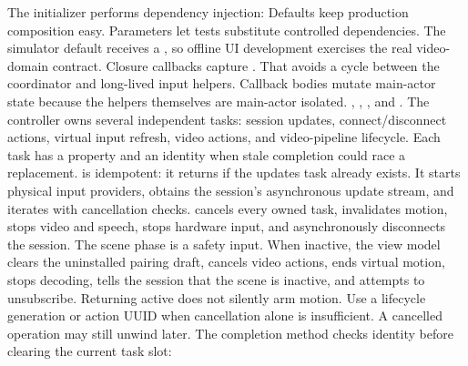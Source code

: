 {}The initializer performs dependency injection:\markdownRendererInterblockSeparator
{}\markdownRendererInterblockSeparator
{}Defaults keep production composition easy. Parameters let tests substitute controlled dependencies. The simulator default receives a , so offline UI development exercises the real video-domain contract.\markdownRendererParagraphSeparator
{}Closure callbacks capture . That avoids a cycle between the coordinator and long-lived input helpers. Callback bodies mutate main-actor state because the helpers themselves are main-actor isolated.\markdownRendererInterblockSeparator
{}
\markdownRendererSectionEnd \markdownRendererSectionBegin
{}\markdownRendererInterblockSeparator
{}\markdownRendererBlockQuoteBegin
{} , , , and .\markdownRendererBlockQuoteEnd \markdownRendererInterblockSeparator
{}The controller owns several independent tasks: session updates, connect/disconnect actions, virtual input refresh, video actions, and video-pipeline lifecycle. Each task has a property and an identity when stale completion could race a replacement.\markdownRendererParagraphSeparator
{} is idempotent: it returns if the updates task already exists. It starts physical input providers, obtains the session's asynchronous update stream, and iterates with cancellation checks.  cancels every owned task, invalidates motion, stops video and speech, stops hardware input, and asynchronously disconnects the session.\markdownRendererParagraphSeparator
{}The scene phase is a safety input. When inactive, the view model clears the uninstalled pairing draft, cancels video actions, ends virtual motion, stops decoding, tells the session that the scene is inactive, and attempts to unsubscribe. Returning active does not silently arm motion.\markdownRendererParagraphSeparator
{}Use a lifecycle generation or action UUID when cancellation alone is insufficient. A cancelled operation may still unwind later. The completion method checks identity before clearing the current task slot:\markdownRendererInterblockSeparator

